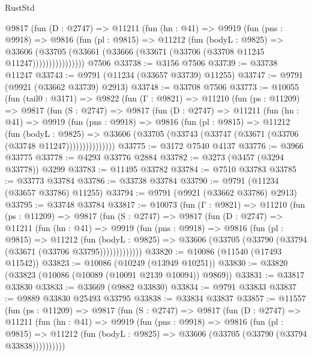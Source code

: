 \begin{lexlean}{RustStd}
\begin{coremodule}
            @9817
              (fun (D : @2747) =>
              @11211
                (fun (hn : @41) =>
                @9919
                  (fun (pns : @9918) =>
                  @9816
                    (fun (pl : @9815) =>
                    @11212
                      (fun (bodyL : @9825) =>
                      @33606
                        (@33705
                          (@33661 (@33666 (@33671 (@33706 (@33708 @11245 @11247))))))))))))))))
    @7506
@33738 := @3156 @7506
@33739 := @33738 @11247
@33743 := @9791 (@11234 (@33657 @33739) @11255)
@33747 := @9791 (@9921 (@33662 @33739) @2913)
@33748 := @33708 @7506
@33773 := @10055
    (fun (tail0 : @3171) =>
    @9822
      (fun (Γ : @9821) =>
      @11210
        (fun (ps : @11209) =>
        @9817
          (fun (S : @2747) =>
          @9817
            (fun (D : @2747) =>
            @11211
              (fun (hn : @41) =>
              @9919
                (fun (pns : @9918) =>
                @9816
                  (fun (pl : @9815) =>
                  @11212
                    (fun (bodyL : @9825) =>
                    @33606 (@33705 (@33743 (@33747 (@33671 (@33706 (@33748 @11247)))))))))))))))
@33775 := @3172 @7540 @4137
@33776 := @3966 @33775
@33778 := @4293 @33776 @2884
@33782 := @3273 (@3457 (@3294 @33778)) @3299
@33783 := @11495 @33782
@33784 := @7510 @33783
@33785 := @33773 @33784
@33786 := @33738 @33784
@33790 := @9791 (@11234 (@33657 @33786) @11255)
@33794 := @9791 (@9921 (@33662 @33786) @2913)
@33795 := @33748 @33784
@33817 := @10073
    (fun (Γ : @9821) =>
    @11210
      (fun (ps : @11209) =>
      @9817
        (fun (S : @2747) =>
        @9817
          (fun (D : @2747) =>
          @11211
            (fun (hn : @41) =>
            @9919
              (fun (pns : @9918) =>
              @9816
                (fun (pl : @9815) =>
                @11212
                  (fun (bodyL : @9825) =>
                  @33606 (@33705 (@33790 (@33794 (@33671 (@33706 @33795)))))))))))))
@33820 := @10086 (@11540 (@17493 @11542))
@33823 := @10086 (@10249 (@13949 @10251))
@33830 := @33820 (@33823 (@10086 (@10089 (@10091 @2139 @10094)) @9869))
@33831 := @33817 @33830
@33833 := @33669 (@9882 @33830)
@33834 := @9791 @33833
@33837 := @9889 @33830 @25493 @33795
@33838 := @33834 @33837
@33857 := @11557
    (fun (ps : @11209) =>
    @9817
      (fun (S : @2747) =>
      @9817
        (fun (D : @2747) =>
        @11211
          (fun (hn : @41) =>
          @9919
            (fun (pns : @9918) =>
            @9816
              (fun (pl : @9815) =>
              @11212 (fun (bodyL : @9825) => @33606 (@33705 (@33790 (@33794 @33838))))))))))

\end{coremodule}
\end{lexlean}
